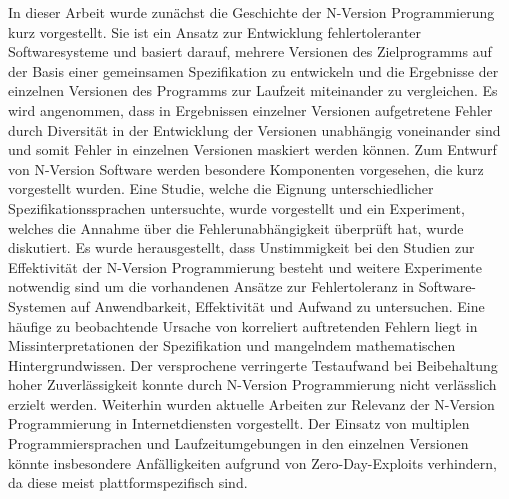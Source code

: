%
In dieser Arbeit wurde zunächst die Geschichte der N-Version Programmierung kurz vorgestellt.
Sie ist ein Ansatz zur Entwicklung fehlertoleranter Softwaresysteme und basiert darauf, mehrere Versionen des Zielprogramms auf der Basis einer gemeinsamen Spezifikation zu entwickeln und die Ergebnisse der einzelnen Versionen des Programms zur Laufzeit miteinander zu vergleichen.
Es wird angenommen, dass in Ergebnissen einzelner Versionen aufgetretene Fehler durch Diversität in der Entwicklung der Versionen unabhängig voneinander sind und somit Fehler in einzelnen Versionen maskiert werden können.
Zum Entwurf von N-Version Software werden besondere Komponenten vorgesehen, die kurz vorgestellt wurden.
Eine Studie, welche die Eignung unterschiedlicher Spezifikationssprachen untersuchte, wurde vorgestellt und ein Experiment, welches die Annahme über die Fehlerunabhängigkeit überprüft hat, wurde diskutiert. Es wurde herausgestellt, dass Unstimmigkeit bei den Studien zur Effektivität der N-Version Programmierung besteht und weitere Experimente notwendig sind um die vorhandenen Ansätze zur Fehlertoleranz in Software-Systemen auf Anwendbarkeit, Effektivität und Aufwand zu untersuchen.
Eine häufige zu beobachtende Ursache von korreliert auftretenden Fehlern liegt in Missinterpretationen der Spezifikation und mangelndem mathematischen Hintergrundwissen. Der versprochene verringerte Testaufwand bei Beibehaltung hoher Zuverlässigkeit konnte durch N-Version Programmierung nicht verlässlich erzielt werden.
Weiterhin wurden aktuelle Arbeiten zur Relevanz der N-Version Programmierung in Internetdiensten vorgestellt. Der Einsatz von multiplen Programmiersprachen und Laufzeitumgebungen in den einzelnen Versionen könnte insbesondere Anfälligkeiten aufgrund von Zero-Day-Exploits verhindern, da diese meist plattformspezifisch sind.